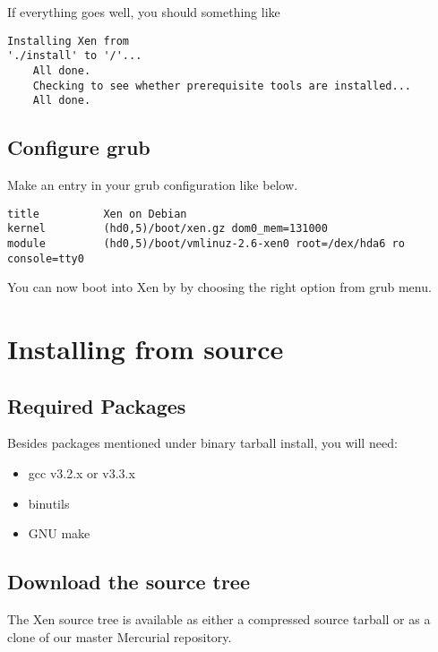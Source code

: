 If everything goes well, you should something like

\begin{verbatim}
Installing Xen from 
'./install' to '/'...
    All done.
    Checking to see whether prerequisite tools are installed...
    All done.
\end{verbatim}


\subsection{Configure grub}
Make an entry in your grub configuration like below.

{\small
\begin{verbatim}
title          Xen on Debian
kernel         (hd0,5)/boot/xen.gz dom0_mem=131000
module         (hd0,5)/boot/vmlinuz-2.6-xen0 root=/dex/hda6 ro console=tty0
\end{verbatim}
}

You can now boot into Xen by by choosing the right option from grub menu.

\section{Installing from source}
\subsection{Required Packages}
Besides packages mentioned under binary tarball install, you will need:

\begin{itemize}
\item gcc v3.2.x or v3.3.x
\item binutils
\item GNU make
\end{itemize}


\subsection{Download the source tree}
The Xen source tree is available as either a compressed source tarball
or as a clone of our master Mercurial repository.

